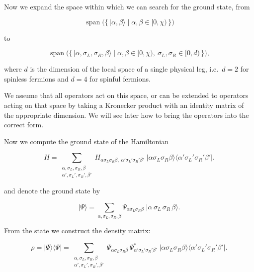 Now we expand the space within which we can search for the ground
state, from

\begin{equation}
\operatorname{span}\Big(\big\{\,|\alpha,\beta\rangle \;\big|\; \alpha,\beta\in[0,\chi)\,\big\}\Big)
\end{equation}

to

\begin{equation}
\operatorname{span}\Big(\big\{\,|\alpha,\sigma_L,\sigma_R,\beta\rangle \;\big|\; \alpha,\beta\in[0,\chi),\ \sigma_L,\sigma_R\in[0,d)\,\big\}\Big),
\end{equation}

where $d$ is the dimension of the local space of a single physical leg,
i.e.\ $d=2$ for spinless fermions and $d=4$ for spinful fermions.

We assume that all operators act on this space, or can be extended to
operators acting on that space by taking a Kronecker product with an
identity matrix of the appropriate dimension. We will see later how to
bring the operators into the correct form.

Now we compute the ground state of the Hamiltonian

\begin{equation}
H = \sum_{\substack{\alpha,\sigma_L,\sigma_R,\beta\\ \alpha',\sigma_L',\sigma_R',\beta'}}
H_{\alpha\sigma_L\sigma_R\beta,\;\alpha'\sigma_L'\sigma_R'\beta'}\;
\big|\alpha\sigma_L\sigma_R\beta\big\rangle\big\langle\alpha'\sigma_L'\sigma_R'\beta'\big|.
\end{equation}

and denote the ground state by

\begin{equation}
|\Psi\rangle = \sum_{\alpha,\sigma_L,\sigma_R,\beta}
\Psi_{\alpha\sigma_L\sigma_R\beta}\;\big|\alpha\,\sigma_L\,\sigma_R\,\beta\big\rangle.
\end{equation}

From the state we construct the density matrix:

\begin{equation}
\rho = |\Psi\rangle\langle\Psi| = \sum_{\substack{\alpha,\sigma_L,\sigma_R,\beta\\ \alpha',\sigma_L',\sigma_R',\beta'}}
\Psi_{\alpha\sigma_L\sigma_R\beta}\,\Psi^*_{\alpha'\sigma_L'\sigma_R'\beta'}\;
\big|\alpha\sigma_L\sigma_R\beta\big\rangle\big\langle\alpha'\sigma_L'\sigma_R'\beta'\big|.
\end{equation}


